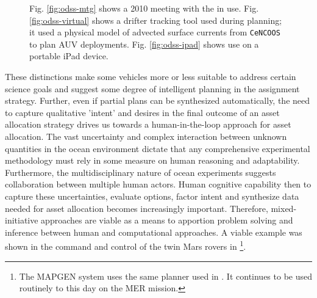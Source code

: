 \begin{figure}
\centering
{}
\caption{\small Fig. \ref{fig:odss-mtg} shows a 2010 \can meeting with
  the \od in use. Fig. \ref{fig:odss-virtual} shows a drifter tracking
  tool used during \can planning; it used a physical model of advected
  surface currents from \texttt{CeNCOOS} \cite{cencoos} to plan AUV
  deployments. Fig. \ref{fig:odss-ipad} shows \od use on a portable
  iPad device.}
\label{fig:odss2}
\end{figure}


These distinctions make some vehicles more or less suitable to address
certain science goals and suggest some degree of intelligent planning
in the assignment strategy. Further, even if partial plans can be
synthesized automatically, the need to capture qualitative 'intent'
and desires in the final outcome of an asset allocation strategy
drives us towards a human-in-the-loop approach for asset
allocation. The vast uncertainty and complex interaction between
unknown quantities in the ocean environment dictate that any
comprehensive experimental methodology must rely in some measure on
human reasoning and adaptability.  Furthermore, the multidisciplinary
nature of ocean experiments suggests collaboration between multiple
human actors. Human cognitive capability then to capture these
uncertainties, evaluate options, factor intent and synthesize data
needed for asset allocation becomes increasingly important. Therefore,
mixed-initiative approaches are viable as a means to apportion problem
solving and inference between human and computational approaches. A
viable example was shown in the command and control of the twin Mars
rovers in \cite{aichang04,bresina05,bresina05a}\footnote{The MAPGEN
  system uses the same \eu planner used in \rx. It continues to be
  used routinely to this day on the MER mission.}.

